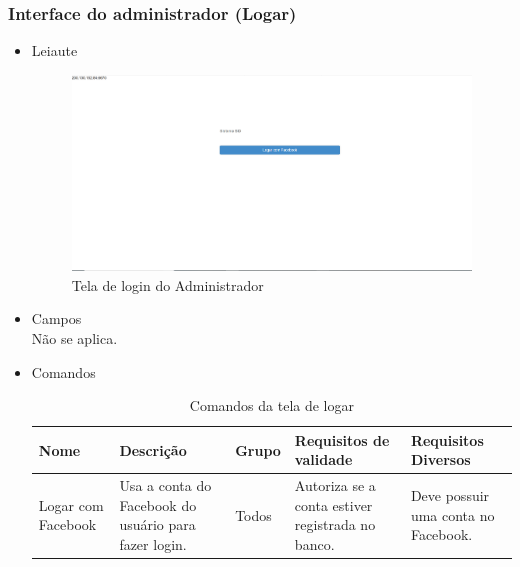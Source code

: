     \subsubsection{Interface do administrador (Logar)}
    \begin{itemize}
        \item Leiaute
            \begin{figure}[H]
                \centering
                \includegraphics[width=\textwidth]{figuras/telalogar}
                \caption{Tela de login do Administrador}
            \end{figure}
        \item Campos\\
            Não se aplica.
        \item Comandos
            \begin{table}[H]
                \caption{Comandos da tela de logar}
                
                \begin{tabular}{|p{2cm}|p{3.3cm}|p{1.1cm}|p{3.9cm}|p{3.5cm}|}
                \hline
Nome & Descrição & Grupo & Requisitos de validade & Requisitos Diversos \\ \hline
Logar com Facebook & Usa a conta do Facebook do usuário para fazer login. & 
Todos & Autoriza se a conta estiver registrada 
no banco. & Deve possuir uma conta no Facebook. \\ \hline
                \end{tabular}
                
            \end{table}
    \end{itemize}
        
